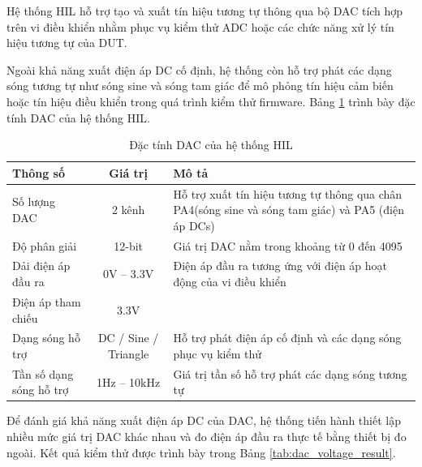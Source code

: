 Hệ thống HIL hỗ trợ tạo và xuất tín hiệu tương tự thông qua bộ DAC tích hợp trên vi điều khiển nhằm phục vụ kiểm thử ADC hoặc các chức năng xử lý tín hiệu tương tự của DUT.

Ngoài khả năng xuất điện áp DC cố định, hệ thống còn hỗ trợ phát các dạng sóng tương tự như sóng sine và sóng tam giác để mô phỏng tín hiệu cảm biến hoặc tín hiệu điều khiển trong quá trình kiểm thử firmware. Bảng \ref{tab:dac_support} trình bày đặc tính DAC của hệ thống HIL.

\begin{table}[H]
\centering
\caption{Đặc tính DAC của hệ thống HIL}
\label{tab:dac_support}
\renewcommand{\arraystretch}{1.2}

\begin{tabularx}{\textwidth}{|l|c|X|}
\hline
\textbf{Thông số} & \textbf{Giá trị} & \textbf{Mô tả} \\
\hline

Số lượng DAC 
& 2 kênh 
& Hỗ trợ xuất tín hiệu tương tự thông qua chân PA4(sóng sine và sóng tam giác) và PA5 (điện áp DCs)\\
\hline

Độ phân giải 
& 12-bit 
& Giá trị DAC nằm trong khoảng từ 0 đến 4095 \\
\hline

Dải điện áp đầu ra 
& 0V -- 3.3V 
& Điện áp đầu ra tương ứng với điện áp hoạt động của vi điều khiển \\
\hline

Điện áp tham chiếu 
& 3.3V 
& \\
\hline

Dạng sóng hỗ trợ 
& DC / Sine / Triangle 
& Hỗ trợ phát điện áp cố định và các dạng sóng phục vụ kiểm thử \\
\hline

Tần số dạng sóng hỗ trợ
& 1Hz -- 10kHz
& Giá trị tần số hỗ trợ phát các dạng sóng tương tự \\
\hline

\end{tabularx}
\end{table}

Để đánh giá khả năng xuất điện áp DC của DAC, hệ thống tiến hành thiết lập nhiều mức giá trị DAC khác nhau và đo điện áp đầu ra thực tế bằng thiết bị đo ngoài. Kết quả kiểm thử được trình bày trong Bảng \ref{tab:dac_voltage_result}.

